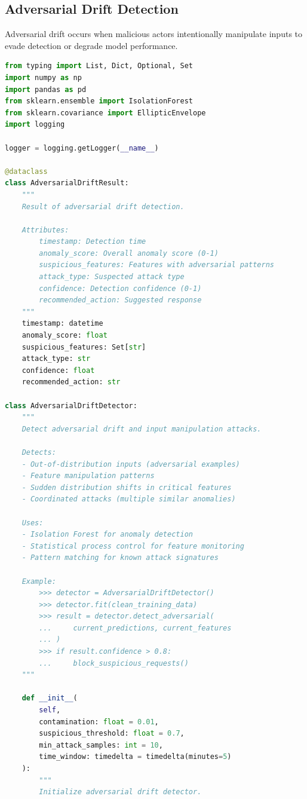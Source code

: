 \subsection{Adversarial Drift Detection}

Adversarial drift occurs when malicious actors intentionally manipulate inputs to evade detection or degrade model performance.

\begin{lstlisting}[language=Python, caption={Adversarial Drift Detector for Security Monitoring}]
from typing import List, Dict, Optional, Set
import numpy as np
import pandas as pd
from sklearn.ensemble import IsolationForest
from sklearn.covariance import EllipticEnvelope
import logging

logger = logging.getLogger(__name__)

@dataclass
class AdversarialDriftResult:
    """
    Result of adversarial drift detection.

    Attributes:
        timestamp: Detection time
        anomaly_score: Overall anomaly score (0-1)
        suspicious_features: Features with adversarial patterns
        attack_type: Suspected attack type
        confidence: Detection confidence (0-1)
        recommended_action: Suggested response
    """
    timestamp: datetime
    anomaly_score: float
    suspicious_features: Set[str]
    attack_type: str
    confidence: float
    recommended_action: str

class AdversarialDriftDetector:
    """
    Detect adversarial drift and input manipulation attacks.

    Detects:
    - Out-of-distribution inputs (adversarial examples)
    - Feature manipulation patterns
    - Sudden distribution shifts in critical features
    - Coordinated attacks (multiple similar anomalies)

    Uses:
    - Isolation Forest for anomaly detection
    - Statistical process control for feature monitoring
    - Pattern matching for known attack signatures

    Example:
        >>> detector = AdversarialDriftDetector()
        >>> detector.fit(clean_training_data)
        >>> result = detector.detect_adversarial(
        ...     current_predictions, current_features
        ... )
        >>> if result.confidence > 0.8:
        ...     block_suspicious_requests()
    """

    def __init__(
        self,
        contamination: float = 0.01,
        suspicious_threshold: float = 0.7,
        min_attack_samples: int = 10,
        time_window: timedelta = timedelta(minutes=5)
    ):
        """
        Initialize adversarial drift detector.


\end{lstlisting}
